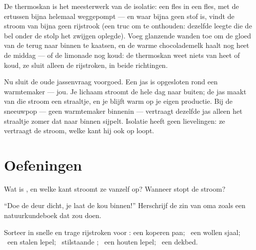 \begin{example}[De thermoskan]\label{ex:g5:heat-and-insulation:thermos}
De thermoskan is het meesterwerk van de isolatie: een fles in een
fles, met de  ertussen bijna helemaal weggepompt --- en waar
bijna geen stof is, vindt de stroom van  bijna geen rijstrook
(een truc om te onthouden: dezelfde leegte die de bel onder de stolp
het zwijgen oplegde). Voeg glanzende wanden toe om de gloed van de
 terug naar binnen te kaatsen, en de warme chocolademelk haalt
nog heet de middag --- of de limonade nog koud: de thermoskan weet
niets van heet of koud, ze sluit alleen de rijstroken, in beide
richtingen.
\end{example}

\begin{remark}\label{rem:g5:heat-and-insulation:coat}
Nu sluit de oude jassenvraag voorgoed. Een jas is opgesloten
 rond een warmtemaker --- jou. Je lichaam stroomt de hele dag
 naar buiten; de jas maakt van die stroom een straaltje, en je
blijft warm op je eigen productie. Bij de sneeuwpop --- geen
warmtemaker binnenin --- vertraagt dezelfde jas alleen het straaltje
zomer dat naar binnen sijpelt. Isolatie heeft geen lievelingen: ze
vertraagt de stroom, welke kant hij ook op loopt.
\end{remark}

\section{Oefeningen}

\begin{exercise}[$\star$]\label{exo:g5:heat-and-insulation:1}
Wat is , en welke kant stroomt ze vanzelf op? Wanneer stopt de
stroom?
\end{exercise}

\begin{exercise}[$\star$]\label{exo:g5:heat-and-insulation:2}
``Doe de deur dicht, je laat de kou binnen!'' Herschrijf de zin van
oma zoals een natuurkundeboek dat zou doen.
\end{exercise}

\begin{exercise}[$\star$]\label{exo:g5:heat-and-insulation:3}
Sorteer in snelle en trage rijstroken voor : een koperen pan; \
een wollen sjaal; \ een stalen lepel; \ stilstaande ; \ een
houten lepel; \ een dekbed.
\end{exercise}

